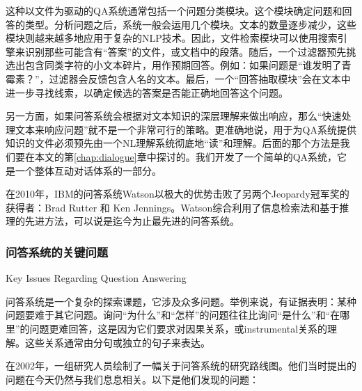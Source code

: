 这种以文件为驱动的QA系统通常包括一个问题分类模块。这个模块确定问题和回答的类型。分析问题之后，系统一般会运用几个模块。文本的数量逐步减少，这些模块则越来越多地应用于复杂的NLP技术。因此，文件检索模块可以使用搜索引擎来识别那些可能含有“答案”的文件，或文档中的段落。随后，一个过滤器预先挑选出包含同类字符的小文本碎片，用作预期回答。例如：如果问题是“谁发明了青霉素？”，过滤器会反馈包含人名的文本。最后，一个“回答抽取模块”会在文本中进一步寻找线索，以确定候选的答案是否能正确地回答这个问题。

另一方面，如果问答系统会根据对文本知识的深层理解来做出响应，那么“快速处理文本来响应问题”就不是一个非常可行的策略。更准确地说，用于为QA系统提供知识的文件必须预先由一个NL理解系统彻底地“读”和理解。后面的那个方法是我们要在本文的第\ref{chap:dialogue}章中探讨的。我们开发了一个简单的QA系统，它是一个整体互动对话体系的一部分。

在2010年，IBM的问答系统Watson以极大的优势击败了另两个Jeopardy冠军奖的获得者：Brad Rutter 和 Ken Jennings。Watson综合利用了信息检索法和基于推理的先进方法\cite{Ferrucci2011}，可以说是迄今为止最先进的问答系统。

\subsubsection{问答系统的关键问题}{Key Issues Regarding Question Answering}

问答系统是一个复杂的探索课题，它涉及众多问题。举例来说，有证据表明：某种问题要难于其它问题。询问“为什么”和“怎样”的问题往往比询问“是什么”和“在哪里”的问题更难回答，这是因为它们要求对因果关系，或instrumental关系的理解。这些关系通常由分句或独立的句子来表达\cite{Hirschman1999}。

在2002年，一组研究人员绘制了一幅关于问答系统的研究路线图\cite{Burger2002}。他们当时提出的问题在今天仍然与我们息息相关。以下是他们发现的问题：

